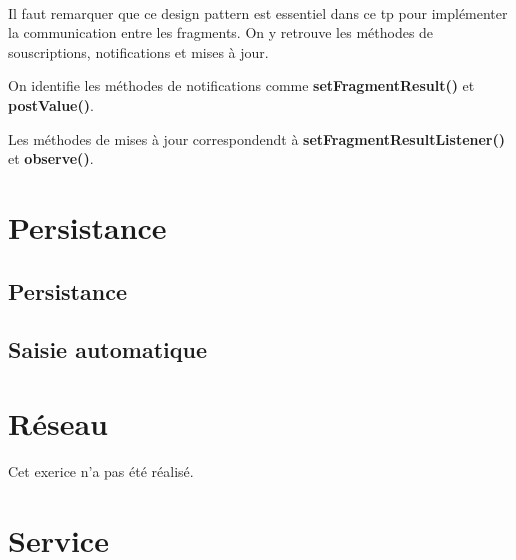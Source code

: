 \documentclass[a4paper]{article}
\begin{document}
\begin{multicols}{2}
                \paragraph{}
                    Il faut remarquer que ce design pattern est essentiel dans ce tp pour implémenter la communication entre les fragments. On y retrouve les méthodes de souscriptions, notifications et mises à jour.

                    On identifie les méthodes de notifications comme \textbf{setFragmentResult()} et \textbf{postValue()}.

                    Les méthodes de mises à jour correspondendt à \textbf{setFragmentResultListener()} et \textbf{observe()}.
        \section{Persistance}
            \subsection{Persistance}
            \subsection{Saisie automatique}
        \section{Réseau}
            Cet exerice n'a pas été réalisé.
        \section{Service}
    \end{multicols}
\end{document}
